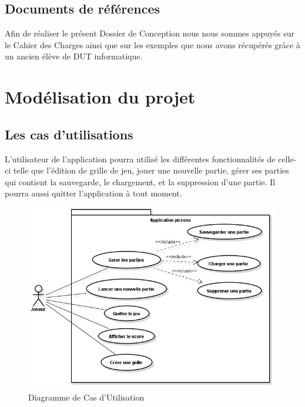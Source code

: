 \documentclass[11pt]{article}
\begin{document}
\subsection{Documents de références}

Afin de réaliser le présent Dossier de Conception nous nous sommes appuyés sur le Cahier des Charges ainsi que sur les
exemples que nous avons récupérés grâce à un ancien élève de DUT informatique.




\newpage


\section{Modélisation du projet}


\subsection{Les cas d'utilisations}

L'utilisateur de l'application pourra utilisé les différentes fonctionnalités de celle-ci telle que l'édition de grille de jeu, jouer une nouvelle partie, gérer ses parties qui contient la sauvegarde, le chargement, et la suppression d'une partie.
Il pourra aussi quitter l'application à tout moment.

	\begin{figure}[!ht]
		\centering
		\includegraphics{./Diagrammes/UserCase.png}
		\caption{Diagramme de Cas d'Utilisation}
	\end{figure}
\end{document}
